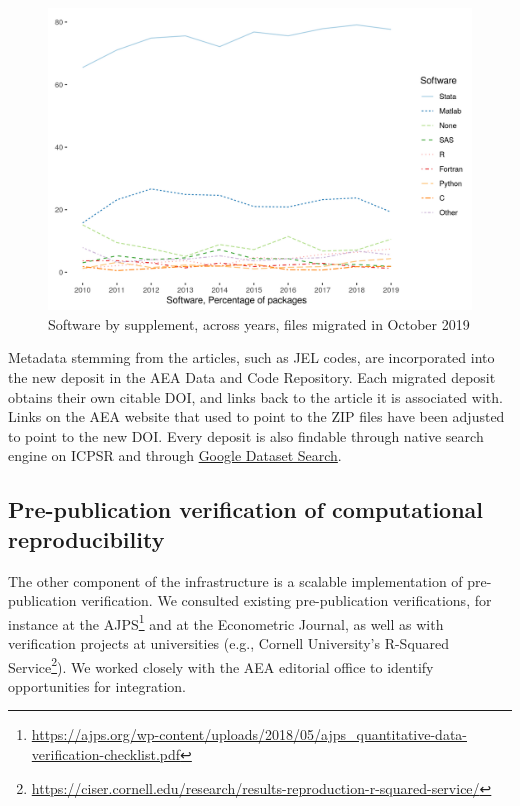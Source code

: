 \documentclass[PP]{AEA}
\newcommand{\aeadcr}{AEA Data and Code Repository}
\newcommand{\urlcite}[2]{#2\footnote{\url{#1}}}
\begin{document}
\begin{figure}
    \centering
    \includegraphics[height=0.4\textheight]{images/figure_migration_software_years_pct.png}
    \caption{Software by supplement, across years, files migrated in October 2019}
    \label{fig:migration_software_years_pct}
\end{figure}

Metadata stemming from the articles, such as JEL codes, are incorporated into the new deposit in the \aeadcr{}. Each migrated deposit  obtains their own citable \ac{DOI}, and links back to the article it is associated with. Links on the AEA website that used to point to the ZIP files have been adjusted to point to the new \ac{DOI}. Every deposit is also findable through native search engine on ICPSR and through \href{https://toolbox.google.com/datasetsearch}{Google Dataset Search}. 

\FloatBarrier

\subsection{Pre-publication verification of computational reproducibility}
\label{sec:verification}
The other component of the infrastructure is a scalable implementation of pre-publication verification. We consulted existing pre-publication verifications, for instance at the \urlcite{https://ajps.org/wp-content/uploads/2018/05/ajps_quantitative-data-verification-checklist.pdf}{\ac{AJPS}} and at the Econometric Journal, as well as with verification projects at universities (e.g., Cornell University's \urlcite{https://ciser.cornell.edu/research/results-reproduction-r-squared-service/}{R-Squared Service}). We worked closely with the AEA editorial office to identify opportunities for integration. 
\end{document}
